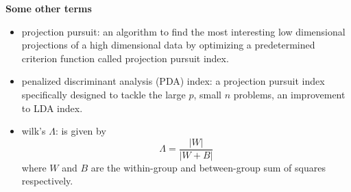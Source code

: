 \documentclass[12]{report}
\begin{document}
\begin{itemize}
%
%
%
%
\end{itemize}

\centerline{\bf\large Some other terms}

\begin{itemize}
\item projection pursuit: an algorithm to find the most interesting low dimensional projections of a high dimensional data by optimizing a predetermined criterion function called projection pursuit index.
\item penalized discriminant analysis (PDA) index: a projection pursuit index specifically designed to tackle the large $p$, small $n$ problems, an improvement to LDA index.
\item wilk's $\Lambda$: is given by $$\Lambda=\frac{|W|}{|W + B|}$$ where $W$ and $B$ are the within-group and between-group sum of squares respectively.
\end{itemize}
\end{document}
